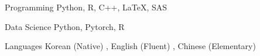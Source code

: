 

\begin{cvskills}

  \cvskill
    {Programming} %
    {Python, R, C++, LaTeX, SAS} %

  \cvskill
    {Data Science} %
    {Python, Pytorch, R} %


  \cvskill
    {Languages} %
    {Korean (Native) , English (Fluent) , Chinese (Elementary)} %

\end{cvskills}
